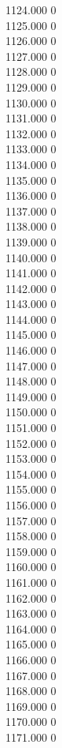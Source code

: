 { 1124.000	0 \\
 1125.000	0 \\
 1126.000	0 \\
 1127.000	0 \\
 1128.000	0 \\
 1129.000	0 \\
 1130.000	0 \\
 1131.000	0 \\
 1132.000	0 \\
 1133.000	0 \\
 1134.000	0 \\
 1135.000	0 \\
 1136.000	0 \\
 1137.000	0 \\
 1138.000	0 \\
 1139.000	0 \\
 1140.000	0 \\
 1141.000	0 \\
 1142.000	0 \\
 1143.000	0 \\
 1144.000	0 \\
 1145.000	0 \\
 1146.000	0 \\
 1147.000	0 \\
 1148.000	0 \\
 1149.000	0 \\
 1150.000	0 \\
 1151.000	0 \\
 1152.000	0 \\
 1153.000	0 \\
 1154.000	0 \\
 1155.000	0 \\
 1156.000	0 \\
 1157.000	0 \\
 1158.000	0 \\
 1159.000	0 \\
 1160.000	0 \\
 1161.000	0 \\
 1162.000	0 \\
 1163.000	0 \\
 1164.000	0 \\
 1165.000	0 \\
 1166.000	0 \\
 1167.000	0 \\
 1168.000	0 \\
 1169.000	0 \\
 1170.000	0 \\
 1171.000	0 \\
}
